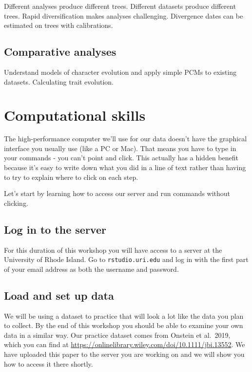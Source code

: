 \documentclass[
]{book}
\begin{document}
Different analyses produce different trees.
Different datasets produce different trees.
Rapid diversification makes analyses challenging.
Divergence dates can be estimated on trees with calibrations.

\hypertarget{comparative-analyses}{%
\section{Comparative analyses}\label{comparative-analyses}}

Understand models of character evolution and apply simple PCMs to existing datasets.
Calculating trait evolution.

\hypertarget{computational-skills}{%
\chapter{Computational skills}\label{computational-skills}}

The high-performance computer we'll use for our data doesn't have the graphical interface
you usually use (like a PC or Mac).
That means you have to type in your commands - you can't point and click.
This actually has a hidden benefit because it's easy to write down what you did in
a line of text rather than having to try to explain where to click on each step.

Let's start by learning how to access our server and run commands without clicking.

\hypertarget{log-in-to-the-server}{%
\section{Log in to the server}\label{log-in-to-the-server}}

For this duration of this workshop you will have access to a server at the University of Rhode Island. Go to \texttt{rstudio.uri.edu} and log in with the first part of your email address as both the username and password.

\hypertarget{load-and-set-up-data}{%
\section{Load and set up data}\label{load-and-set-up-data}}

We will be using a dataset to practice that will look a lot like the data you plan to collect.
By the end of this workshop you should be able to examine your own data in a similar way.
Our practice dataset comes from Onstein et al.~2019, which you can find at \url{https://onlinelibrary.wiley.com/doi/10.1111/jbi.13552}.
We have uploaded this paper to the server you are working on and we will show you how to access it there shortly.
\end{document}
